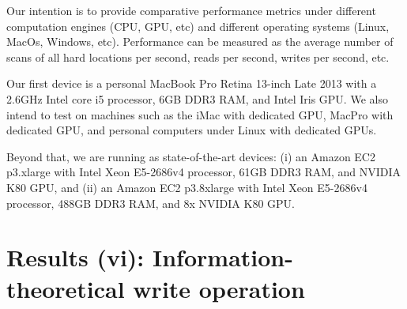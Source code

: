 Our intention is to provide comparative performance metrics under different computation engines (CPU, GPU, etc) and different operating systems (Linux, MacOs, Windows, etc). Performance can be measured as the average number of scans of all hard locations per second, reads per second, writes per second, etc.

Our first device is a personal MacBook Pro Retina 13-inch Late 2013 with a 2.6GHz Intel core i5 processor, 6GB DDR3 RAM, and Intel Iris GPU.  We also intend to test on machines such as the iMac with dedicated GPU, MacPro with dedicated GPU, and personal computers under Linux with dedicated GPUs.

Beyond that, we are running as state-of-the-art devices: (i) an Amazon EC2 p3.xlarge with Intel Xeon E5-2686v4 processor, 61GB DDR3 RAM, and NVIDIA K80 GPU, and (ii) an Amazon EC2 p3.8xlarge with Intel Xeon E5-2686v4 processor, 488GB DDR3 RAM, and 8x NVIDIA K80 GPU.




\chapter{Results (vi): Information-theoretical write operation}


